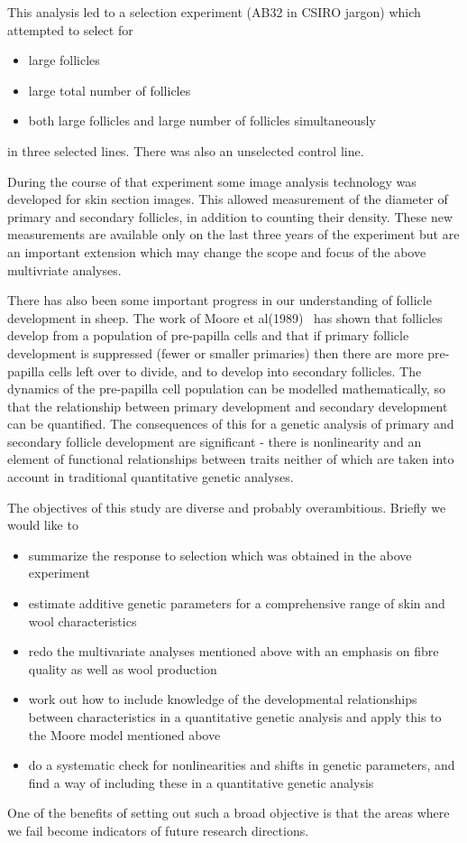 \documentclass[titlepage]{article}  %
\begin{document}
	This analysis led to a selection experiment (AB32 in CSIRO jargon) which attempted to select for
\begin{itemize}
\item large follicles
\item large total number of follicles
\item both large follicles and large number of follicles simultaneously
\end{itemize}
in three selected lines. There was also an unselected control line.

During the course of that experiment some image analysis technology was developed for skin section images. This allowed measurement of the diameter of primary and secondary follicles, in addition to counting their density. These new measurements are available only on the last three years of the experiment but are an important extension which may change the scope and focus of the above multivriate analyses.

There has also been some important progress in our understanding of follicle development in sheep. The work of Moore et al(1989)~\cite{moor:89} has shown that follicles develop from a population of pre-papilla cells and that if primary follicle development is suppressed (fewer or smaller primaries) then there are more pre-papilla cells left over to divide, and to develop into secondary follicles. The dynamics of the pre-papilla cell population can be modelled mathematically, so that the relationship between primary development and secondary development can be quantified. The consequences of this for a genetic analysis of primary and secondary follicle development are significant - there is nonlinearity and an element of functional relationships between traits neither of which are taken into account in traditional quantitative genetic analyses.

The objectives of this study  are diverse and probably overambitious. Briefly we would like to
\begin{itemize}
\item summarize the response to selection which was obtained in the above experiment
\item estimate additive genetic parameters for a comprehensive range of skin and wool characteristics
\item redo the multivariate analyses mentioned above with an emphasis on fibre quality as well as wool production
\item work out how to include knowledge of the developmental relationships between characteristics in a quantitative genetic analysis and apply this to the Moore model mentioned above
\item do a systematic check for nonlinearities and shifts in genetic parameters, and find a way of including these in a quantitative genetic analysis
\end{itemize}
One of the benefits of setting out such a broad objective is that the areas where we fail become indicators of future research directions.
\end{document}
